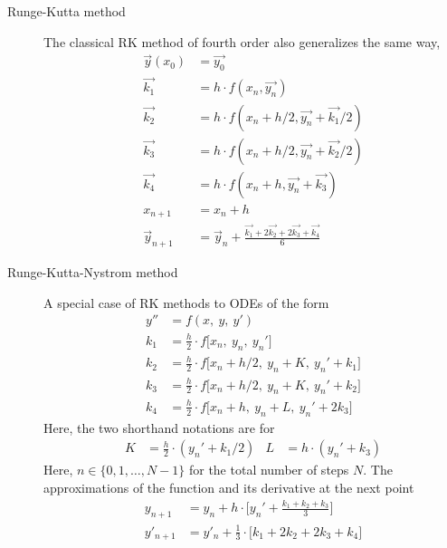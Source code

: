 \begin{description}
    \item[Runge-Kutta method] The classical RK method of fourth order also generalizes
        the same way,
        \begin{align}
            \vec{y}(x_0)  & = \vec{y_0}                                             \\
            \vec{k_1}     & = h \cdot f(x_n, \vec{y_n})
            \nonumber                                                               \\
            \vec{k_2}     & = h \cdot f(x_n + h/2, \vec{y_n} + \vec{k_1}/2)
            \nonumber                                                               \\
            \vec{k_3}     & = h \cdot f(x_n + h/2, \vec{y_n} + \vec{k_2}/2)
            \nonumber                                                               \\
            \vec{k_4}     & = h \cdot f(x_n + h, \vec{y_n} + \vec{k_3})             \\
            x_{n+1}       & = x_n + h                                               \\
            \vec{y}_{n+1} & = \vec{y}_n + \frac{\vec{k_1} + 2\vec{k_2} + 2\vec{k_3}
                + \vec{k_4}}{6}
        \end{align}

    \item[Runge-Kutta-Nystrom method] A special case of RK methods to ODEs of the form
        \begin{align}
            y'' & = f(x,\ y,\ y')                                                  \\
            k_1 & = \frac{h}{2} \cdot f\Big[x_n,\ y_n,\ y_n'\Big]                  \\
            k_2 & = \frac{h}{2} \cdot f\Big[x_n + h/2,\ y_n + K,\ y_n' + k_1 \Big] \\
            k_3 & = \frac{h}{2} \cdot f\Big[x_n + h/2,\ y_n + K,\ y_n' + k_2 \Big] \\
            k_4 & = \frac{h}{2} \cdot f\Big[x_n + h,\ y_n + L,\ y_n' + 2k_3 \Big]
        \end{align}
        Here, the two shorthand notations are for
        \begin{align}
            K & = \frac{h}{2} \cdot (y_n' + k_1/2) &
            L & = h \cdot (y_n' + k_3)
        \end{align}
        Here, $ n \in\{0,1,\dots,N-1\} $ for the total number of steps $ N $. The
        approximations of the function and its derivative at the next point
        \begin{align}
            y_{n+1}  & = y_n + h \cdot \Bigg[ y_n' + \frac{k_1 + k_2 + k_3}{3} \Bigg] \\
            y'_{n+1} & = y'_n + \frac{1}{3} \cdot \Big[ k_1 + 2k_2 + 2k_3 + k_4 \Big]
        \end{align}


\end{description}
